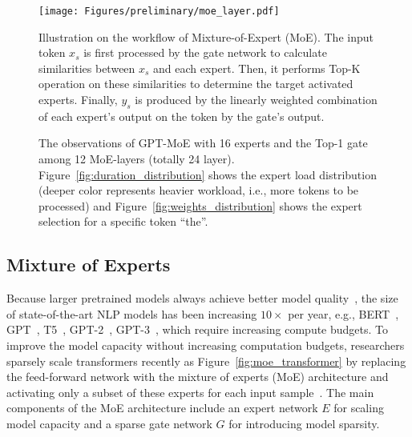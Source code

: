 \begin{figure}[t]
    \centering
    \texttt{[image: Figures/preliminary/moe\_layer.pdf]}
    \caption{Illustration on the workflow of Mixture-of-Expert (MoE). The input token $x_s$ is first processed by the gate network to calculate similarities between $x_s$ and each expert. Then, it performs Top-K operation on these similarities to determine the target activated experts. Finally, $y_s$ is produced by the linearly weighted combination of each expert's output on the token by the gate's output. }
    \label{fig:moe_layer}
\end{figure}

\begin{figure*}[t]
    \centering
    \caption{The observations of GPT-MoE with 16 experts and the Top-1 gate among 12 MoE-layers (totally 24 layer).
    Figure~\ref{fig:duration_distribution} shows the expert load distribution (deeper color represents heavier workload, i.e., more tokens to be processed) and Figure~\ref{fig:weights_distribution} shows the expert selection for a specific token ``the''.}
    \label{fig:dense_moe}
\end{figure*}

\subsection{Mixture of Experts}
Because larger pretrained models always achieve better model quality~\cite{DBLP:scaling_laws}, the size of state-of-the-art NLP models has been increasing $10\times$ per year, e.g., BERT~\cite{DBLP:conf/naacl/BERT}, GPT~\cite{gpt}, T5~\cite{DBLP:googleT5}, GPT-2~\cite{gpt2}, GPT-3~\cite{DBLP:conf/nips/gpt3}, which require increasing compute budgets. To improve the model capacity without increasing computation budgets, researchers sparsely scale transformers recently as Figure~\ref{fig:moe_transformer} by replacing the feed-forward network with the mixture of experts (MoE) architecture and activating only a subset of these experts for each input sample~\cite{DBLP:lstm_moe, DBLP:switch, DBLP:gshard}.
The main components of the MoE architecture include an expert network $E$ for scaling model capacity and a sparse gate network $G$ for introducing model sparsity. 

